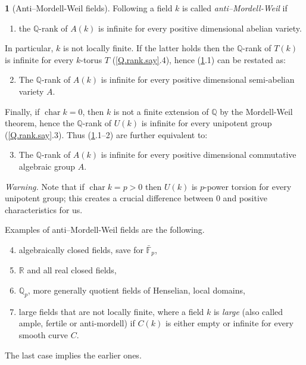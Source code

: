 \documentclass{amsart}
\theoremstyle{definition}
\newtheorem{say}[thm]{}
\theoremstyle{remark}
\renewcommand{\r}[0]{{\mathbb R}}
\newcommand{\f}[0]{{\mathbb F}}
\newcommand{\q}[0]{{\mathbb Q}}
\newcommand{\chr}[0]{\operatorname{char}}
\begin{document}
\begin{say}[Anti--Mordell-Weil fields] \label{anti-mordell.defn} Following \cite{2019arXiv190204011I} a   field $k$ is called {\it anti--Mordell-Weil} if 
\begin{enumerate}
\item the $\q$-rank of
$A(k)$ is infinite  for every
positive dimensional abelian variety. 
\end{enumerate}
In particular, $k$ is not locally  finite. 
If the latter holds then  the $\q$-rank of
$T(k)$ is infinite  for every  $k$-torus  $T$ (\ref{Q.rank.say}.4), hence (\ref{anti-mordell.defn}.1) can be restated as: 
\begin{enumerate}\setcounter{enumi}{1}
\item The $\q$-rank of
$A(k)$ is infinite  for every
positive dimensional semi-abelian variety $A$. 
\end{enumerate}
Finally, if $\chr k=0$, then  $k$ is not a finite extension of $\q$ by the Mordell-Weil theorem, hence the  $\q$-rank of
$U(k)$ is infinite  for every unipotent group (\ref{Q.rank.say}.3). Thus  (\ref{anti-mordell.defn}.1--2) are further equivalent to:
\begin{enumerate}\setcounter{enumi}{2}
\item The $\q$-rank of
$A(k)$ is infinite  for every
positive dimensional commutative algebraic group  $A$. 
\end{enumerate}
{\it Warning.} Note that if $\chr k=p>0$ then $U(k)$ is $p$-power torsion  for every unipotent group; this creates a crucial difference between 0 and positive characteristics for us.


Examples of anti--Mordell-Weil fields are the following.
\begin{enumerate}\setcounter{enumi}{3}
\item algebraically closed fields, save for $\bar \f_p$,
\item $\r$ and all real closed fields,
\item $\q_p$, more generally quotient fields of  Henselian, local domains,
\item large fields    \cite{MR2284973, MR2652895, 2019arXiv191210710F} that are not locally finite, where a field $k$ is {\it large} (also called ample, fertile  or anti-mordell) if  $C(k)$ is either empty or infinite for every smooth curve $C$.
\end{enumerate}
The last case implies  the earlier ones.

 \end{say}
\end{document}

